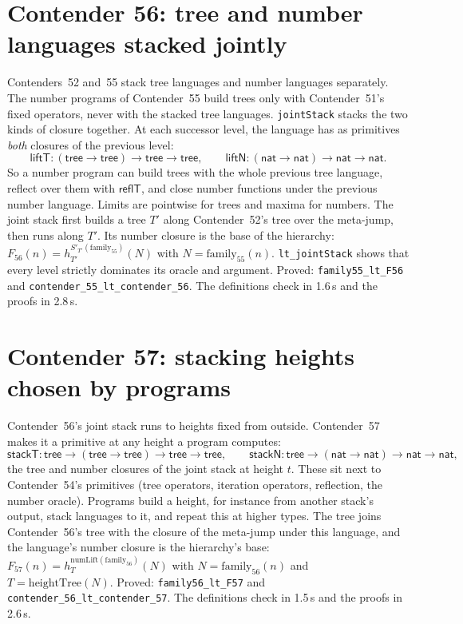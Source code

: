 \documentclass[11pt]{article}
\theoremstyle{definition}
\theoremstyle{remark}
\newcommand{\lean}[1]{\texttt{#1}}
\begin{document}
\section{Contender 56: tree and number languages stacked jointly}

Contenders~52 and~55 stack tree languages and number languages separately.
The number programs of Contender~55 build trees only with Contender~51's fixed
operators, never with the stacked tree languages. \lean{jointStack} stacks the
two kinds of closure together. At each successor level, the language has as
primitives \emph{both} closures of the previous level:
\[
\mathsf{liftT}:(\mathsf{tree}\to\mathsf{tree})\to\mathsf{tree}\to\mathsf{tree},\qquad
\mathsf{liftN}:(\mathsf{nat}\to\mathsf{nat})\to\mathsf{nat}\to\mathsf{nat}.
\]
So a number program can build trees with the whole previous tree language,
reflect over them with $\mathsf{reflT}$, and close number functions under the
previous number language. Limits are pointwise for trees and maxima for
numbers. The joint stack first builds a tree $T'$ along Contender~52's tree over
the meta-jump, then runs along $T'$. Its number closure is the base of the
hierarchy: $F_{56}(n)=h^{S'_{T'}(\mathrm{family}_{55})}_{T'}(N)$ with
$N=\mathrm{family}_{55}(n)$. \lean{lt\_jointStack} shows that every level
strictly dominates its oracle and argument. Proved: \lean{family55\_lt\_F56} and
\lean{contender\_55\_lt\_\allowbreak contender\_56}. The definitions check in
1.6\,s and the proofs in 2.8\,s.

\section{Contender 57: stacking heights chosen by programs}

Contender~56's joint stack runs to heights fixed from outside. Contender~57
makes it a primitive at any height a program computes:
\[
\mathsf{stackT}:\mathsf{tree}\to(\mathsf{tree}\to\mathsf{tree})\to\mathsf{tree}\to\mathsf{tree},\qquad
\mathsf{stackN}:\mathsf{tree}\to(\mathsf{nat}\to\mathsf{nat})\to\mathsf{nat}\to\mathsf{nat},
\]
the tree and number closures of the joint stack at height $t$. These sit next to
Contender~54's primitives (tree operators, iteration operators, reflection, the
number oracle). Programs build a height, for instance from another stack's
output, stack languages to it, and repeat this at higher types. The tree joins
Contender~56's tree with the closure of the meta-jump under this language, and
the language's number closure is the hierarchy's base:
$F_{57}(n)=h^{\mathrm{numLift}(\mathrm{family}_{56})}_{T}(N)$ with
$N=\mathrm{family}_{56}(n)$ and $T=\mathrm{heightTree}(N)$. Proved:
\lean{family56\_lt\_F57} and \lean{contender\_56\_lt\_\allowbreak contender\_57}.
The definitions check in 1.5\,s and the proofs in 2.6\,s.
\end{document}
